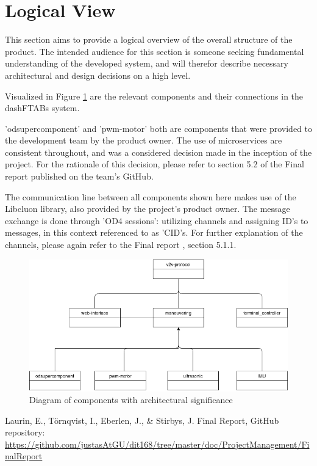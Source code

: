 \documentclass[12pt]{article}
\begin{document}
\section{Logical View}
This section aims to provide a logical overview of the overall structure of the product. The intended audience for this section is someone seeking fundamental understanding of the developed system, and will therefor describe necessary architectural and design decisions on a high level. 

Visualized in Figure \ref{fig:classDiagramLogigal} are the relevant components and their connections in the dashFTABs system. 

'odsupercomponent' and 'pwm-motor' both are components that were provided to the development team by the product owner. The use of microservices are consistent throughout, and was a considered decision made in the inception of the project. For the rationale of this decision, please refer to section 5.2 of the Final report \cite{FinalReport} published on the team's GitHub.   

The communication line between all components shown here makes use of the Libcluon library, also provided by the project's product owner. The message exchange is done through 'OD4 sessions': utilizing channels and assigning ID's to messages, in this context referenced to as 'CID's. For further explanation of the channels, please again refer to the Final report \cite{FinalReport}, section 5.1.1.
\FloatBarrier %
\begin{figure}
\centering
\includegraphics[width=\linewidth]{Diagrams/logical_view.png}
\caption{Diagram of components with architectural significance}
\label{fig:classDiagramLogigal}
\end{figure}
\FloatBarrier %
\begin{thebibliography}{9}
 Laurin, E., Törnqvist, I., Eberlen, J., \& Stirbys, J. Final Report, GitHub repository:
\url{https://github.com/justasAtGU/dit168/tree/master/doc/ProjectManagement/FinalReport}
\end{thebibliography}
\end{document}
